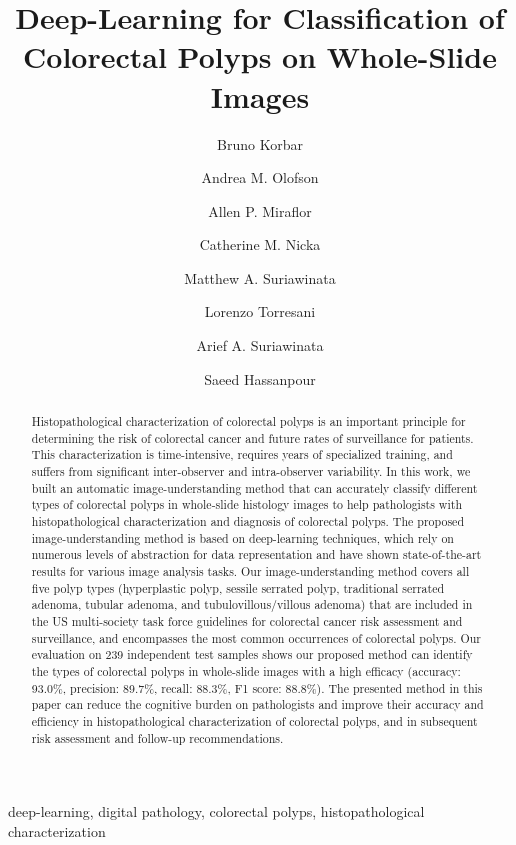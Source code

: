 \documentclass[review]{elsarticle}
\begin{document}
\begin{frontmatter}

\title{Deep-Learning for Classification of Colorectal Polyps on Whole-Slide Images}


\author[biomed,compsci]{Bruno Korbar}
\author[dhmc_footnote]{Andrea M. Olofson}
\author[dhmc_footnote]{Allen P. Miraflor}
\author[dhmc_footnote]{Catherine M. Nicka}
\author[dhmc_footnote]{Matthew A. Suriawinata}
\author[compsci]{Lorenzo Torresani}
\author[dhmc_footnote]{Arief A. Suriawinata}
\author[biomed,compsci,epi]{Saeed Hassanpour}


\address[biomed]{Biomedical Data Science Department, The Geisel School of Medicine at Dartmouth}
\address[dhmc_footnote]{Department of Pathology and Laboratory Medicine, The Geisel School of Medicine at Dartmouth}
\address[compsci]{Computer Science Department, Dartmouth College}
\address[epi]{Epidemiology Department, The Geisel School of Medicine at Dartmouth}

\begin{abstract}
Histopathological characterization of colorectal polyps is an important
principle for determining the risk of colorectal cancer and future rates of surveillance for patients.
This characterization is time-intensive, requires years of specialized
training, and suffers from significant inter-observer and intra-observer variability.
In this work, we built an automatic image-understanding method that can
accurately classify different types of colorectal polyps in whole-slide histology
images to help pathologists with histopathological characterization and
diagnosis of colorectal polyps. The proposed image-understanding method is based on deep-learning techniques,
which rely on numerous levels of abstraction for data representation
and have shown state-of-the-art results for various image analysis tasks.
Our image-understanding method covers all five polyp types (hyperplastic
polyp, sessile serrated polyp, traditional serrated adenoma, tubular adenoma,
and tubulovillous/villous adenoma) that are included in the US multi-society
task force guidelines for colorectal cancer risk assessment and surveillance,
and encompasses the most common occurrences of colorectal polyps.
Our evaluation on 239 independent test samples shows our proposed method can identify
the types of colorectal polyps in whole-slide images with a high efficacy
(accuracy: 93.0\%, precision: 89.7\%, recall: 88.3\%, F1 score: 88.8\%).
The presented method in this paper can reduce the cognitive burden on pathologists and improve their accuracy and efficiency
in histopathological characterization of colorectal polyps, and in subsequent risk assessment and follow-up recommendations.

\end{abstract}

\begin{keyword}
deep-learning, digital pathology, colorectal polyps, histopathological characterization
\end{keyword}

\end{frontmatter}
\end{document}
